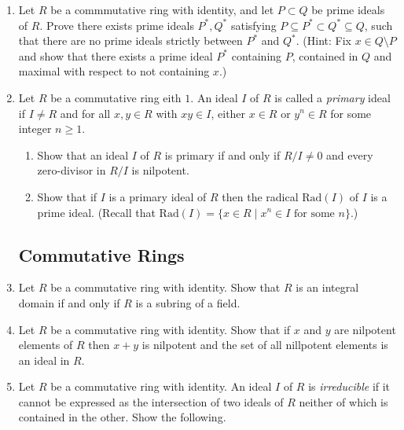 \documentclass{article}
\theoremstyle{definition}
\begin{document}
\begin{enumerate}
            \item Let $R$ be a commmutative ring with identity, and let $P\subset Q$ be prime ideals of $R$. Prove there exists prime ideals $P^*, Q^*$ satisfying $P\subseteq P^* \subset Q^* \subseteq Q$, such that there are no prime ideals strictly between $P^*$ and $Q^*$. (Hint: Fix $x\in Q \setminus P$ and show that there exists a prime ideal $P^*$ containing $P$, contained in $Q$ and maximal with respect to not containing $x$.)
        
            \item Let $R$ be a commutative ring eith $1$. An ideal $I$ of $R$ is called a \textit{primary} ideal if $I\neq R$ and for all $x,y\in R$ with $xy\in I$, either $x\in R$ or $y^n\in R$ for some integer $n \geq 1$.
            
            \begin{enumerate}
                \item Show that an ideal $I$ of $R$ is primary if and only if $R/I \neq 0$ and every zero-divisor in $R/I$ is nilpotent.
                \item Show that if $I$ is a primary ideal of $R$ then the radical $\text{Rad}(I)$ of $I$ is a prime ideal. (Recall that $\text{Rad}(I)=\{x\in R\mid x^n\in I \text{ for some } n\}$.)
            \end{enumerate}

        \subsection{Commutative Rings}

            \item Let $R$ be a commutative ring with identity. Show that $R$ is an integral domain if and only if $R$ is a subring of a field. 
            
            \item Let $R$ be a commutative ring with identity. Show that if $x$ and $y$ are nilpotent elements of $R$ then $x+y$ is nilpotent and the set of all nillpotent elements is an ideal in $R$.
            
            \item Let $R$ be a commutative ring with identity. An ideal $I$ of $R$ is \textit{irreducible} if it cannot be expressed as the intersection of two ideals of $R$ neither of which is contained in the other. Show the following. 
            

\end{enumerate}
\end{document}
